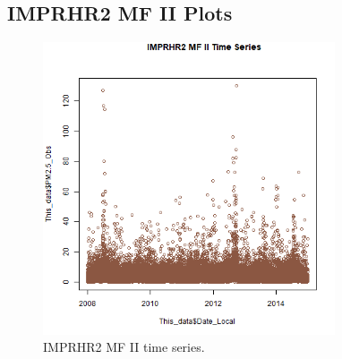 
\subsection{IMPRHR2 MF II Plots}
\begin{figure} 
\centering 
\includegraphics[width=0.77\textwidth]{Code_Outputs/IMPRHR2MFII_time_series.png} 
\caption{\label{fig:IMPRHR2MFIITS}IMPRHR2 MF II time series.} 
\end{figure} 
 
